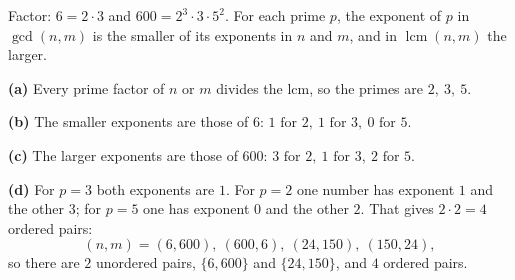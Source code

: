 Factor: $6=2\cdot3$ and $600=2^3\cdot3\cdot5^2$. For each prime $p$, the exponent of $p$ in $\gcd(n,m)$ is the smaller of its exponents in $n$ and $m$, and in $\operatorname{lcm}(n,m)$ the larger.

\textbf{(a)} Every prime factor of $n$ or $m$ divides the lcm, so the primes are $\boxed{2,\ 3,\ 5}$.

\textbf{(b)} The smaller exponents are those of $6$: $\boxed{1\text{ for }2,\ 1\text{ for }3,\ 0\text{ for }5}$.

\textbf{(c)} The larger exponents are those of $600$: $\boxed{3\text{ for }2,\ 1\text{ for }3,\ 2\text{ for }5}$.

\textbf{(d)} For $p=3$ both exponents are $1$. For $p=2$ one number has exponent $1$ and the other $3$; for $p=5$ one has exponent $0$ and the other $2$. That gives $2\cdot2=4$ ordered pairs:
\[
(n,m)=(6,600),\ (600,6),\ (24,150),\ (150,24),
\]
so there are $\boxed{2}$ unordered pairs, $\{6,600\}$ and $\{24,150\}$, and $\boxed{4}$ ordered pairs.

